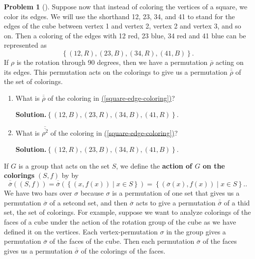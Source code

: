 \documentclass[10pt,]{book}
\newcommand{\terminology}[1]{\textbf{#1}}
\theoremstyle{plain}
\theoremstyle{definition}
\newtheorem{activity}[project]{Problem}
\theoremstyle{definition}
\numberwithin{equation}{chapter}
\begin{document}
\begin{activity}[]\label{activity-284}
Suppose now that instead of coloring the vertices of a square, we color its edges. We will use the shorthand 12, 23, 34, and 41 to stand for the edges of the cube between vertex 1 and vertex 2, vertex 2 and vertex 3, and so on. Then a coloring of the edges with 12 red, 23 blue, 34 red and 41 blue can be represented as%
\begin{equation}
\left\{(12,R),(23,B),(34,R),(41,B)\right\}\text{.}\label{square-edge-coloring}
\end{equation}
If \(\rho\) is the rotation through 90 degrees, then we have a permutation \(\overline{\rho}\) acting on its edges. This permutation acts on the colorings to give us a permutation \(\overline{\overline{\rho}}\) of the set of colorings.%
\begin{enumerate}[font=\bfseries,label=(\alph*),ref=\alph*]
\item\label{task-208} What is \(\overline{\overline{\rho}}\) of the coloring in \hyperref[square-edge-coloring]{(\ref{square-edge-coloring})}?%
\par\medskip\noindent%
\textbf{Solution.}\quad \(\left\{(12, B), (23, R), (34, B), (41, R)\right\}\).%
\item\label{task-209} What is \(\overline{\overline{\rho^2}}\) of the coloring in \hyperref[square-edge-coloring]{(\ref{square-edge-coloring})}?%
\par\medskip\noindent%
\textbf{Solution.}\quad \(\left\{(12, R), (23, B), (34, R), (41, B)\right\}\).%
\end{enumerate}
\end{activity}
If \(G\) is a group that acts on the set \(S\), we define the \terminology{action of \(G\) on the colorings} \((S,f)\) by by%
\begin{equation}
\overline{\overline{\sigma}}((S,f))=\overline{\overline{\sigma}}\left(\left\{(x,f(x))\mid x\in S\right\}\right) = \left\{\left(\overline{\sigma}(x),f(x)\right)\mid x\in S\right\}.\text{.}\label{action-on-colorings}
\end{equation}
We have two bars over \(\sigma\) because \(\sigma\) is a permutation of one set that gives us a permutation \(\overline{\sigma}\) of a setcond set, and then \(\overline{\sigma}\) acts to give a permutation \(\overline{\overline{\sigma}}\) of a thid set, the set of colorings. For example, suppose we want to analyze colorings of the faces of a cube under the action of the rotation group of the cube as we have defined it on the vertices. Each vertex-permutation \(\sigma\) in the group gives a permutation \(\overline{\sigma}\) of the faces of the cube. Then each permutation \(\overline{\sigma}\) of the faces gives us a permutation \(\overline{\overline{\sigma}}\) of the colorings of the faces.%
\end{document}
